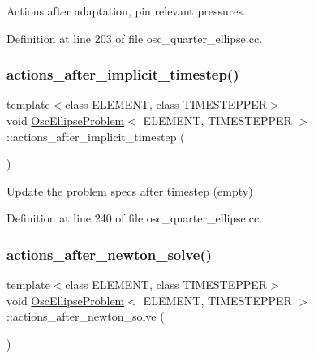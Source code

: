 Actions after adaptation, pin relevant pressures. 



Definition at line 203 of file osc\+\_\+quarter\+\_\+ellipse.\+cc.

\mbox{\label{classOscEllipseProblem_a80b50009a6aba4b6920c11b86b06f0f9}} 
\subsubsection{\texorpdfstring{actions\+\_\+after\+\_\+implicit\+\_\+timestep()}{actions\_after\_implicit\_timestep()}}
{\footnotesize\ttfamily template$<$class E\+L\+E\+M\+E\+NT, class T\+I\+M\+E\+S\+T\+E\+P\+P\+ER$>$ \\
void \hyperlink{classOscEllipseProblem}{Osc\+Ellipse\+Problem}$<$ E\+L\+E\+M\+E\+NT, T\+I\+M\+E\+S\+T\+E\+P\+P\+ER $>$\+::actions\+\_\+after\+\_\+implicit\+\_\+timestep (\begin{DoxyParamCaption}{ }\end{DoxyParamCaption})\hspace{0.3cm}{\ttfamily [inline]}}



Update the problem specs after timestep (empty) 



Definition at line 240 of file osc\+\_\+quarter\+\_\+ellipse.\+cc.

\mbox{\label{classOscEllipseProblem_a268e14b24e3ac922e7362bbb37ccde1f}} 
\subsubsection{\texorpdfstring{actions\+\_\+after\+\_\+newton\+\_\+solve()}{actions\_after\_newton\_solve()}}
{\footnotesize\ttfamily template$<$class E\+L\+E\+M\+E\+NT, class T\+I\+M\+E\+S\+T\+E\+P\+P\+ER$>$ \\
void \hyperlink{classOscEllipseProblem}{Osc\+Ellipse\+Problem}$<$ E\+L\+E\+M\+E\+NT, T\+I\+M\+E\+S\+T\+E\+P\+P\+ER $>$\+::actions\+\_\+after\+\_\+newton\+\_\+solve (\begin{DoxyParamCaption}{ }\end{DoxyParamCaption})\hspace{0.3cm}{\ttfamily [inline]}}



